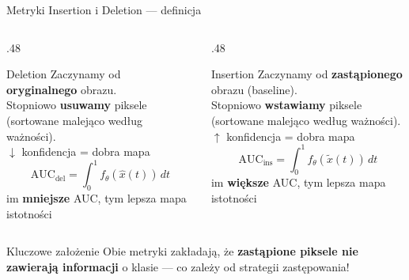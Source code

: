 \documentclass[aspectratio=169, 12pt]{beamer}
\begin{document}
\begin{frame}{Metryki Insertion i Deletion — definicja}
  \begin{columns}[T]
    \begin{column}{.48\textwidth}
      \begin{block}{Deletion}
        Zaczynamy od \textbf{oryginalnego} obrazu.\\
        Stopniowo \textbf{usuwamy} piksele (sortowane malejąco
        według ważności).\\[4pt]
        \textcolor{accentred}{$\downarrow$ konfidencja = dobra mapa}\\[4pt]
        \[ \text{AUC}_\text{del} = \int_0^1 f_\theta(\hat{x}(t))\,dt \]
        \small im \textbf{mniejsze} AUC, tym lepsza mapa istotności
      \end{block}
    \end{column}
    \begin{column}{.48\textwidth}
      \begin{block}{Insertion}
        Zaczynamy od \textbf{zastąpionego} obrazu (baseline).\\
        Stopniowo \textbf{wstawiamy} piksele (sortowane malejąco
        według ważności).\\[4pt]
        \textcolor{successgreen}{$\uparrow$ konfidencja = dobra mapa}\\[4pt]
        \[ \text{AUC}_\text{ins} = \int_0^1 f_\theta(\tilde{x}(t))\,dt \]
        \small im \textbf{większe} AUC, tym lepsza mapa istotności
      \end{block}
    \end{column}
  \end{columns}
  \vspace{8pt}
  \begin{alertblock}{Kluczowe założenie}
    Obie metryki zakładają, że \textbf{zastąpione piksele nie zawierają informacji}
    o klasie — co zależy od strategii zastępowania!
  \end{alertblock}
\end{frame}
\end{document}
